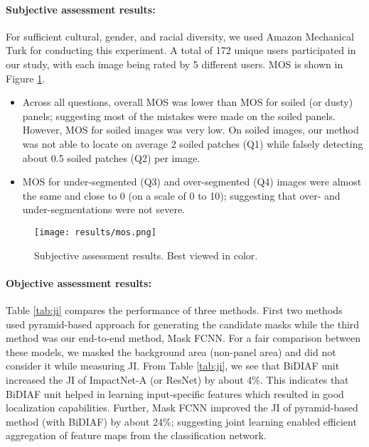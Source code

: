 \documentclass[10pt,twocolumn,letterpaper]{article}
\begin{document}
\paragraph{Subjective assessment results:} For sufficient cultural, gender, and racial diversity, we used Amazon Mechanical Turk for conducting this experiment. A total of 172 unique users participated in our study, with each image being rated by 5 different users. MOS is shown in Figure \ref{fig:mos}. 
\begin{itemize}[itemsep=0pt]
\item[{(1)}] Across all questions, overall MOS was lower than MOS for soiled (or dusty) panels; suggesting most of the mistakes were made on the soiled panels. However, MOS for soiled images was very low. On soiled images, our method was not able to locate on average 2 soiled patches (Q1) while falsely detecting about 0.5 soiled patches (Q2) per image. 
\item[{(2)}] MOS for under-segmented (Q3) and over-segmented (Q4) images were almost the same and close to 0 (on a scale of 0 to 10); suggesting that over- and under-segmentations were not severe.
\end{itemize}
\begin{figure}[t!]
\centering
    \texttt{[image: results/mos.png]}
    \setlength{\belowcaptionskip}{-2mm}
    \caption{Subjective assessment results. Best viewed in color.}
    \label{fig:mos}
\end{figure}

\vspace{-4mm}
\paragraph{Objective assessment results:} Table \ref{tab:ji} compares the performance of three methods. First two methods used pyramid-based approach for generating the candidate masks while the third method was our end-to-end method, Mask FCNN. For a fair comparison between these models, we masked the background area (non-panel area) and did not consider it while measuring JI. From Table \ref{tab:ji}, we see that BiDIAF unit increased the JI of ImpactNet-A (or ResNet) by about 4\%. This indicates that BiDIAF unit helped in learning input-specific features which resulted in good localization capabilities. Further, Mask FCNN improved the JI of pyramid-based method (with BiDIAF) by about 24\%; suggesting joint learning enabled efficient aggregation of feature maps from the classification network.
\end{document}
